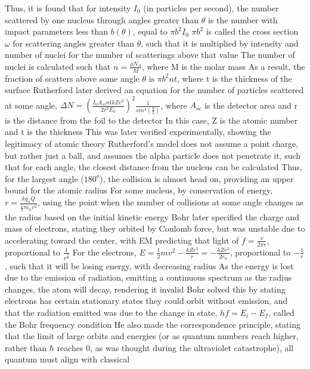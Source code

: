 \documentclass[11 pt, twoside]{article}
\newenvironment{outline*}
{
	\begin{outline}[enumerate]
	}
	{\end{outline}
}
\begin{document}
\begin{outline*}
		\3 Thus, it is found that for intensity $I_0$ (in particles per second), the number scattered by one nucleus through angles greater than $\theta$ is the number with impact parameters less than $b(\theta)$, equal to $\pi b^2 I_0$
		\3 $\pi b^2$ is called the cross section $\omega$ for scattering angles greater than $\theta$, such that it is multiplied by intensity and number of nuclei for the number of scatterings above that value
			\4 The number of nuclei is calculated such that $n = \frac{\rho N_A}{M}$, where M is the molar mass
			\4 As a result, the fraction of scatters above some angle $\theta$ is $\pi b^2 nt$, where t is the thickness of the surface
	\2 Rutherford later derived an equation for the number of particles scattered at some angle, $\Delta N = (\frac{I_0A_{sc}ntkZe^2}{2r^2E_k})^2\frac{1}{sin^4(\frac{\theta}{2})}$, where $A_{sc}$ is the detector area and r is the distance from the foil to the detector
		\3 In this case, Z is the atomic number and t is the thickness
		\3 This was later verified experimentally, showing the legitimacy of atomic theory
	\2 Rutherford's model does not assume a point charge, but rather just a ball, and assumes the alpha particle does not penetrate it, such that for each angle, the closest distance from the nucleus can be calculated
		\3 Thus, for the largest angle ($180^o$), the collision is almost head on, providing an upper bound for the atomic radius
		\3 For some nucleus, by conservation of energy, $r = \frac{kq_{\alpha}Q}{\frac{1}{2}m_{\alpha}v^2}$, using the point when the number of collisions at some angle changes as the radius based on the initial kinetic energy
\1 Bohr later specified the charge and mass of electrons, stating they orbited by Coulomb force, but was unstable due to accelerating toward the center, with EM predicting that light of $f = \frac{v}{2\pi r}$, proportional to $\frac{1}{r^{\frac{3}{2}}}$
	\2 For the electrons, $E = \frac{1}{2}mv^2 - \frac{kZe^2}{r} = -\frac{kZe^2}{2r_n}$, proportional to $-\frac{1}{r}$, such that it will be losing energy, with decreasing radius
		\3 As the energy is lost due to the emission of radiation, emitting a continuous spectrum as the radius changes, the atom will decay, rendering it invalid
	\2 Bohr solved this by stating electrons has certain stationary states they could orbit without emission, and that the radiation emitted was due to the change in state, $hf = E_i - E_f$, called the Bohr frequency condition
		\3 He also made the correspondence principle, stating that the limit of large orbits and energies (or as quantum numbers reach higher, rather than $\hbar$ reaches 0, as was thought during the ultraviolet catastrophe), all quantum must align with classical

\end{outline*}
\end{document}
